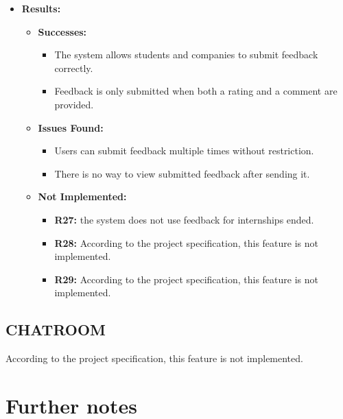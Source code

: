 \begin{itemize}
    \item \textbf{Results:}
    \begin{itemize}
        \item \textbf{Successes:}
        \begin{itemize}
            \item The system allows students and companies to submit feedback correctly.
            \item Feedback is only submitted when both a rating and a comment are provided.
        \end{itemize}
        \item \textbf{Issues Found:}
        \begin{itemize}
            \item Users can submit feedback multiple times without restriction.
            \item There is no way to view submitted feedback after sending it.
        \end{itemize}
        \item \textbf{Not Implemented:}
        \begin{itemize}
            \item \textbf{R27:} the system does not use feedback for internships ended.
            \item \textbf{R28:} According to the project specification, this feature is not implemented.
            \item \textbf{R29:} According to the project specification, this feature is not implemented.
        \end{itemize}
    \end{itemize}
\end{itemize}


\subsection{CHATROOM}\label{subsec:chatroom}
According to the project specification, this feature is not implemented.


\section{Further notes}\label{sec:further-notes}
